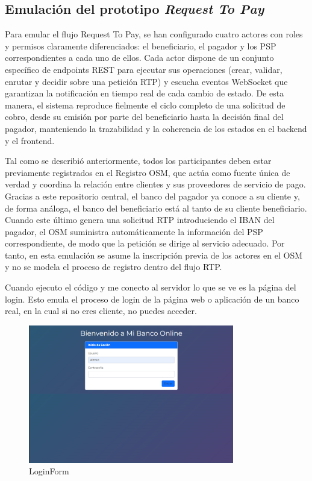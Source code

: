 \subsection{Emulación del prototipo \textit{Request To Pay}}
\label{subsec:EmulacionRTP}
Para emular el flujo Request To Pay, se han configurado cuatro actores con roles y permisos claramente diferenciados: el beneficiario, el pagador y los PSP correspondientes a cada uno de ellos. Cada actor dispone de un conjunto específico de endpoints REST para ejecutar sus operaciones (crear, validar, enrutar y decidir sobre una petición RTP) y escucha eventos WebSocket que garantizan la notificación en tiempo real de cada cambio de estado. De esta manera, el sistema reproduce fielmente el ciclo completo de una solicitud de cobro, desde su emisión por parte del beneficiario hasta la decisión final del pagador, manteniendo la trazabilidad y la coherencia de los estados en el backend y el frontend.

Tal como se describió anteriormente, todos los participantes deben estar previamente registrados en el Registro OSM, que actúa como fuente única de verdad y coordina la relación entre clientes y sus proveedores de servicio de pago. Gracias a este repositorio central, el banco del pagador ya conoce a su cliente y, de forma análoga, el banco del beneficiario está al tanto de su cliente beneficiario. Cuando este último genera una solicitud RTP introduciendo el IBAN del pagador, el OSM suministra automáticamente la información del PSP correspondiente, de modo que la petición se dirige al servicio adecuado. Por tanto, en esta emulación se asume la inscripción previa de los actores en el OSM y no se modela el proceso de registro dentro del flujo RTP.

Cuando ejecuto el código y me conecto al servidor lo que se ve es la página del login. Esto emula el proceso de login de la página web o aplicación de un banco real, en la cual si no eres cliente, no puedes acceder.

\begin{figure}[H]
  \centering
  \includegraphics[width=0.8\textwidth]{Imagenes/LoginForm.png}
  \caption{LoginForm}
  \label{fig:Login}
\end{figure}

